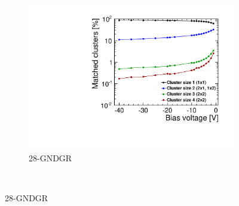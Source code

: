 \begin{figure}[htbp]
\begin{subfigure}[b]{0.33\textwidth}
    \includegraphics[width=\textwidth]{./figures/TestBeam/cluSize_biasScan_W0019_L08.pdf}
    \caption{28-GNDGR}
  \end{subfigure} \\


\end{figure}
